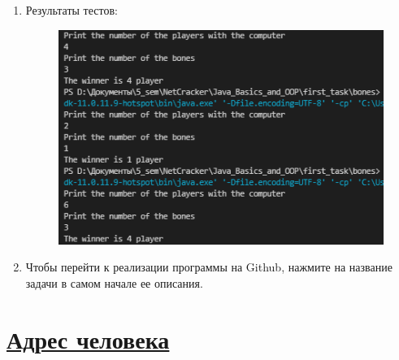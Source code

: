 \documentclass[a4paper]{article}
\begin{document}
\begin{enumerate}
        \item Результаты тестов:
        
        \begin{figure}[h!]
            \begin{center}
                \includegraphics[scale = 0.8]{test_t2.png}
                \label{p2} %
            \end{center}
        \end{figure}

        \item Чтобы перейти к реализации программы на Github, нажмите на название задачи в самом начале ее описания.
    
    \end{enumerate}

\section{\href{https://github.com/julproh/5_sem/tree/main/NetCracker/Java_Basics_and_OOP/first_task/address}{Адрес человека}}
\end{document}
